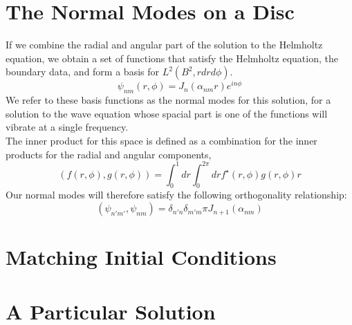 \documentclass{paper}
\begin{document}
\section{The Normal Modes on a Disc}
If we combine the radial and angular part of the solution to the Helmholtz equation, we obtain a set of functions that satisfy the Helmholtz equation, the boundary data, and form a basis for $L^2(B^2,rdrd\phi)$. 
\begin{equation}
  \boxed{
    \psi_{nm}(r,\phi) = J_n ( \alpha_{nm} r) e^{i n \phi}
  }
\end{equation}
We refer to these basis functions as the normal modes for this solution, for a solution to the wave equation whose spacial part is one of the functions will vibrate at a single frequency.\\
The inner product for this space is defined as a combination for the inner products for the radial and angular components,
\begin{equation}
  \boxed{
    \left(f(r,\phi),g(r,\phi)\right) = \int_0 ^1 dr \int_0 ^{2\pi} dr f^\star(r,\phi) g(r,\phi) r
  }
\end{equation}
Our normal modes will therefore satisfy the following orthogonality relationship:
\begin{equation}
  (\psi_{n'm'},\psi_{nm}) = \delta_{n'n}\delta_{m'm} \pi J_{n+1}( \alpha_{nm } )
\end{equation}

\section{Matching Initial Conditions}
\section{A Particular Solution}

\newpage
\end{document}
